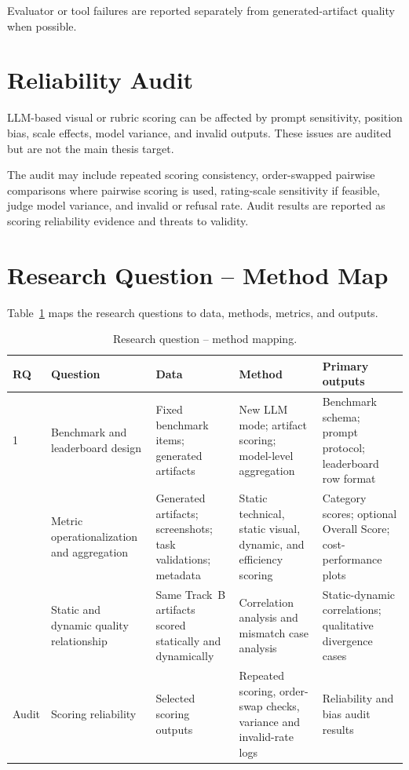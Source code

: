 Evaluator or tool failures are reported separately from generated-artifact
quality when possible.

\section{Reliability Audit}
\label{sec:reliability-audit}

LLM-based visual or rubric scoring can be affected by prompt sensitivity,
position bias, scale effects, model variance, and invalid outputs. These issues
are audited but are not the main thesis target.

The audit may include repeated scoring consistency, order-swapped pairwise
comparisons where pairwise scoring is used, rating-scale sensitivity if
feasible, judge model variance, and invalid or refusal rate. Audit results are
reported as scoring reliability evidence and threats to validity.

\section{Research Question -- Method Map}
\label{sec:rq-map}

Table~\ref{tab:rq-map} maps the research questions to data, methods, metrics,
and outputs.

\begin{table}[t]
  \centering
  \caption{Research question -- method mapping.}
  \label{tab:rq-map}
  \small
  \setlength{\tabcolsep}{4pt}
  \begin{tabular}{p{0.7cm} p{4.0cm} p{2.4cm} p{3.0cm} p{3.9cm}}
    \toprule
    \textbf{RQ} & \textbf{Question} & \textbf{Data} & \textbf{Method}
      & \textbf{Primary outputs} \\
    \midrule
    1 & Benchmark and leaderboard design
      & Fixed benchmark items; generated artifacts
      & New LLM mode; artifact scoring; model-level aggregation
      & Benchmark schema; prompt protocol; leaderboard row format \\
    \addlinespace
    2 & Metric operationalization and aggregation
      & Generated artifacts; screenshots; task validations; metadata
      & Static technical, static visual, dynamic, and efficiency scoring
      & Category scores; optional Overall Score; cost-performance plots \\
    \addlinespace
    3 & Static and dynamic quality relationship
      & Same Track~B artifacts scored statically and dynamically
      & Correlation analysis and mismatch case analysis
      & Static-dynamic correlations; qualitative divergence cases \\
    \addlinespace
    Audit & Scoring reliability
      & Selected scoring outputs
      & Repeated scoring, order-swap checks, variance and invalid-rate logs
      & Reliability and bias audit results \\
    \bottomrule
  \end{tabular}
\end{table}

